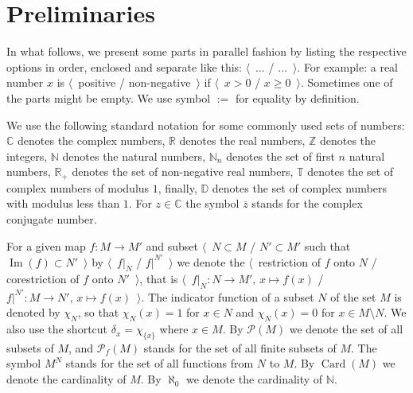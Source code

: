 
\chapter{Preliminaries}\label{ChapterPreliminaries} 


In what follows, we present some parts in parallel fashion by listing the
respective options in order, enclosed and separate like this:
$\langle$~$\ldots$ / $\ldots$~$\rangle$. For example: a real number $x$ is
$\langle$~positive / non-negative~$\rangle$ if $\langle$~$x>0$ / $x\geq
0$~$\rangle$. Sometimes one of the parts might be empty. We use symbol $:=$ for
equality by definition.

We use the following standard notation for some commonly used sets of numbers:
$\mathbb{C}$ denotes the complex numbers, $\mathbb{R}$ denotes the real numbers,
$\mathbb{Z}$ denotes the integers, $\mathbb{N}$ denotes the natural numbers,
$\mathbb{N}_n$ denotes the set of first $n$ natural numbers, $\mathbb{R}_+$
denotes the set of non-negative real numbers, $\mathbb{T}$ denotes the set of
complex numbers of modulus $1$, finally, $\mathbb{D}$ denotes the set of complex
numbers with modulus less than $1$. For $z\in\mathbb{C}$ the symbol
$\overline{z}$ stands for the complex conjugate number.

For a given map $f:M\to M'$ and subset $\langle$~$N\subset M$ / $N'\subset M'$
such that $\operatorname{Im}(f)\subset N'$~$\rangle$ by $\langle$~$f|_N$ /
$f|^{N'}$~$\rangle$ we denote the  $\langle$~restriction of $f$ onto $N$ /
corestriction of $f$ onto $N'$~$\rangle$, that is $\langle$~$f|_N:N\to
M',\,x\mapsto f(x)$ / $f|^{N'}:M\to N',\, x\mapsto f(x)$~$\rangle$. The indicator
function of a subset $N$ of the set $M$ is denoted by $\chi_{N}$, so that
$\chi_N(x)=1$ for $x\in N$ and $\chi_N(x)=0$ for $x\in M\setminus N$. We also
use the shortcut $\delta_x=\chi_{ \{x \}}$ where $x\in M$. By $\mathcal{P}(M)$
we denote the set of all subsets of $M$, and $\mathcal{P}_{f}(M)$ stands for the
set of all finite subsets of $M$. The symbol $M^N$ stands for the set of all
functions from $N$ to $M$. By $\operatorname{Card}(M)$ we denote the cardinality
of $M$. By $\aleph_0$ we denote the cardinality of $\mathbb{N}$.

